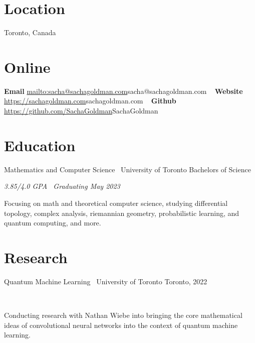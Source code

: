 \documentclass[]{style}
\begin{document}

\begin{aside} %
\section{Location}
Toronto, Canada
\section{Online}
\textbf{Email}
\url{mailto:sacha@sachagoldman.com}{sacha@sachagoldman.com} 
~ \vspace{-2mm}
\textbf{Website} 
\url{https://sachagoldman.com}{sachagoldman.com} 
~ \vspace{-2mm}
\textbf{Github}
\url{https://github.com/SachaGoldman}{SachaGoldman}
\end{aside}

\section{Education}

\begin{entrylist}

\entry
{Mathematics and Computer Science \ {\normalfont University of Toronto}}
{Bachelors of Science}
{\emph{3.85/4.0 GPA \ Graduating May 2023}
~ \vspace{1mm}

Focusing on math and theoretical computer science, studying differential topology, complex analysis, riemannian geometry, probabilistic learning, and quantum computing, and more.}

\end{entrylist}

\section{Research}

\begin{entrylist}

\vspace{1mm}

\entry
{Quantum Machine Learning \ {\normalfont University of Toronto}}
{Toronto, 2022}
{ ~ \vspace{-3.5mm}

Conducting research with Nathan Wiebe into bringing the core mathematical ideas of convolutional neural networks into the context of quantum machine learning.}

\end{entrylist}
\end{document}
